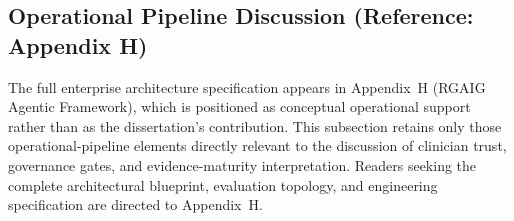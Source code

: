 \subsection{Operational Pipeline Discussion (Reference: Appendix H)}

\noindent The full enterprise architecture specification appears in Appendix~H (RGAIG Agentic Framework), which is positioned as conceptual operational support rather than as the dissertation's contribution. This subsection retains only those operational-pipeline elements directly relevant to the discussion of clinician trust, governance gates, and evidence-maturity interpretation. Readers seeking the complete architectural blueprint, evaluation topology, and engineering specification are directed to Appendix~H.

